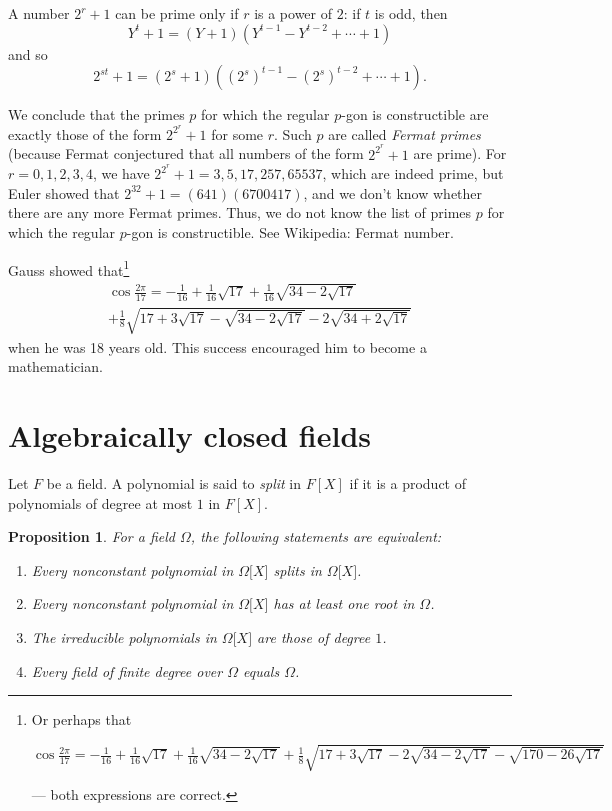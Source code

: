 \documentclass[a4paper,11pt,final,openany]{memoir}
\newtheorem{proposition}[X]{Proposition}
\theoremstyle{nonumberplain}
\begin{document}
A number $2^{r}+1$ can be prime only if $r$ is a power of $2$: if $t$ is odd,
then
\[
Y^{t}+1=(Y+1)(Y^{t-1}-Y^{t-2}+\cdots+1)
\]
and so%
\[
2^{st}+1=(2^{s}+1)((2^{s})^{t-1}-(2^{s})^{t-2}+\cdots+1)\text{.}%
\]


We conclude that the primes $p$ for which the regular $p$-gon is constructible
are exactly those of the form $2^{2^{r}}+1$ for some $r$. Such $p$ are called
\emph{Fermat primes}%
(because Fermat conjectured that all numbers of the form $2^{2^{r}}+1$ are
prime). For $r=0,1,2,3,4$, we have $2^{2^{r}}+1=3,5,17,257,65537$, which are
indeed prime, but Euler showed that $2^{32}+1=(641)(6700417)$, and we don't
know whether there are any more Fermat primes. Thus, we do not know the list
of primes $p$ for which the regular $p$-gon is constructible. See Wikipedia:
Fermat number.

Gauss showed that\footnote{Or perhaps that
\par
$\cos\frac{2\pi}{17}=-\frac{1}{16}+\frac{1}{16}\sqrt{17}+\frac{1}{16}%
\sqrt{34-2\sqrt{17}}+\frac{1}{8}\sqrt{17+3\sqrt{17}-2\sqrt{34-2\sqrt{17}%
}-\sqrt{170-26\sqrt{17}}}$
\par
--- both expressions are correct.}
\begin{align*}
\cos\frac{2\pi}{17}=-\frac{1}{16}+\frac{1}{16}\sqrt{17}+\frac{1}{16}%
\sqrt{34-2\sqrt{17}}\\
+\frac{1}{8}\sqrt{17+3\sqrt{17}-\sqrt{34-2\sqrt{17}%
}-2\sqrt{34+2\sqrt{17}}}%
\end{align*}
when he was 18 years old. This success encouraged him to become a mathematician.

\section{Algebraically closed fields}

Let $F$ be a field. A polynomial is said to
%
\emph{split} in $F[X]$ if it is a product of polynomials of degree at most $1$
in $F[X]$.

\begin{proposition}
\label{ac1}For a field $\Omega$, the following statements are equivalent:

\begin{enumerate}
\item Every nonconstant polynomial in $\Omega\lbrack X]$ splits in
$\Omega\lbrack X]$.

\item Every nonconstant polynomial in $\Omega\lbrack X]$ has at least one root
in $\Omega$.

\item The irreducible polynomials in $\Omega\lbrack X]$ are those of degree
$1$.

\item Every field of finite degree over $\Omega$ equals $\Omega$.
\end{enumerate}
\end{proposition}
\end{document}
